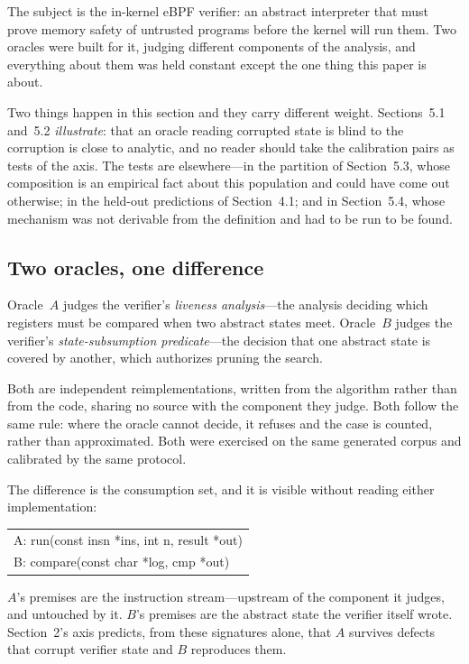 The subject is the in-kernel eBPF verifier: an abstract interpreter that must prove
memory safety of untrusted programs before the kernel will run them. Two oracles
were built for it, judging different components of the analysis, and everything
about them was held constant except the one thing this paper is about.

Two things happen in this section and they carry different weight. Sections~5.1
and~5.2 \emph{illustrate}: that an oracle reading corrupted state is blind to the
corruption is close to analytic, and no reader should take the calibration pairs as
tests of the axis. The tests are elsewhere---in the partition of Section~5.3, whose
composition is an empirical fact about this population and could have come out
otherwise; in the held-out predictions of Section~4.1; and in Section~5.4, whose
mechanism was not derivable from the definition and had to be run to be found.

\subsection{Two oracles, one difference}

Oracle~$A$ judges the verifier's \emph{liveness analysis}---the analysis deciding
which registers must be compared when two abstract states meet. Oracle~$B$ judges
the verifier's \emph{state-subsumption predicate}---the decision that one abstract
state is covered by another, which authorizes pruning the search.

Both are independent reimplementations, written from the algorithm rather than from
the code, sharing no source with the component they judge. Both follow the same
rule: where the oracle cannot decide, it refuses and the case is counted, rather than
approximated. Both were exercised on the same generated corpus and calibrated by the
same protocol.

The difference is the consumption set, and it is visible without reading either
implementation:

\begin{center}
\ttfamily\footnotesize\raggedright
\begin{tabular}{@{}l@{}}
A: run(const insn *ins, int n, result *out)\\
B: compare(const char *log, cmp *out)
\end{tabular}
\end{center}

\noindent$A$'s premises are the instruction stream---upstream of the component it
judges, and untouched by it. $B$'s premises are the abstract state the verifier
itself wrote. Section~2's axis predicts, from these signatures alone, that $A$
survives defects that corrupt verifier state and $B$ reproduces them.

